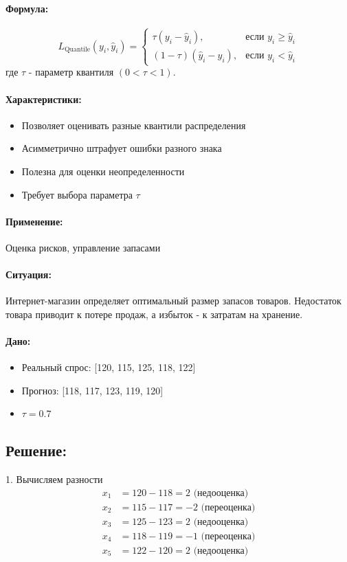 \documentclass[12pt]{article}
\theoremstyle{definition}
\theoremstyle{definition}
\theoremstyle{definition}
\theoremstyle{remark}
\theoremstyle{remark}
\begin{document}
\paragraph{Формула:}

\[
L_{\text{Quantile}}(y_i, \hat{y}_i) = 
\begin{cases} 
\tau (y_i - \hat{y}_i), & \text{если } y_i \geq \hat{y}_i \\
(1 - \tau) (\hat{y}_i - y_i), & \text{если } y_i < \hat{y}_i
\end{cases}
\]
где $\tau$ - параметр квантиля $(0 < \tau < 1)$.

\paragraph{Характеристики:}
\begin{itemize}
    \item Позволяет оценивать разные квантили распределения
    \item Асимметрично штрафует ошибки разного знака
    \item Полезна для оценки неопределенности
    \item Требует выбора параметра $\tau$
\end{itemize}

\paragraph{Применение:} Оценка рисков, управление запасами

\paragraph{Ситуация:} Интернет-магазин определяет оптимальный размер запасов товаров. Недостаток товара приводит к потере продаж, а избыток - к затратам на хранение.

\paragraph{Дано:}
\begin{itemize}
    \item Реальный спрос: [120, 115, 125, 118, 122]
    \item Прогноз: [118, 117, 123, 119, 120]
    \item $\tau = 0.7$
\end{itemize}

\subsection*{Решение:}
1. Вычисляем разности
\[
\begin{aligned}
x_1 &= 120 - 118 = 2 \text{ (недооценка)} \\
x_2 &= 115 - 117 = -2 \text{ (переоценка)} \\
x_3 &= 125 - 123 = 2 \text{ (недооценка)} \\
x_4 &= 118 - 119 = -1 \text{ (переоценка)} \\
x_5 &= 122 - 120 = 2 \text{ (недооценка)}
\end{aligned}
\]
\end{document}
